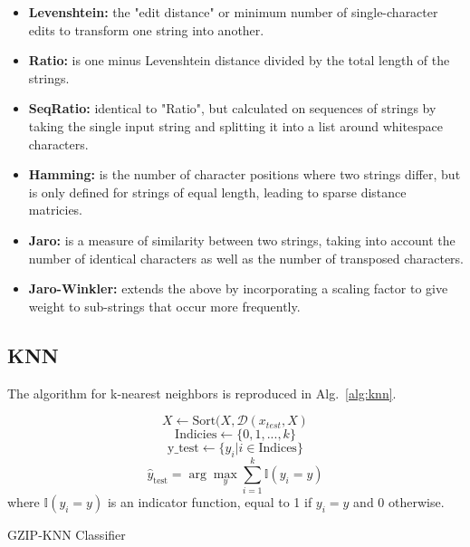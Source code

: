 \documentclass[sigconf]{acmart}
\begin{document}
\begin{itemize}
    \item \textbf{Levenshtein:} the "edit distance" or minimum number of single-character edits to transform one string into another.
    \item \textbf{Ratio:} is one minus Levenshtein distance divided by the total length of the strings.
    \item \textbf{SeqRatio:} identical to "Ratio", but calculated on sequences of strings by taking the single input string and splitting it into a list around whitespace characters.
    \item \textbf{Hamming:} is the number of character positions where two strings differ, but is only defined for strings of equal length, leading to sparse distance matricies.
    \item \textbf{Jaro:} is a measure of similarity between two strings, taking into account the number of identical characters as well as the number of transposed characters.
    \item \textbf{Jaro-Winkler:} extends the above by incorporating a scaling factor to give weight to sub-strings that occur more frequently. 
\end{itemize}


\subsection{KNN}
The algorithm for k-nearest neighbors is reproduced in Alg.~\ref{alg:knn}.

\begin{algorithm}
    
    \[
    X \leftarrow \textrm{Sort}(X, \mathcal{D}(x_{test}, X)
    \]
    \[
    \textrm{Indicies} \leftarrow \{ 0, 1, ..., k \}
    \]
    \[
    \textrm{y_{test}} \leftarrow \{y_i | i \in \textrm{Indices} \}
    \]
    \[
    \hat{y}_{\text{test}} = \arg\max_y \sum_{i=1}^{k} \mathbb{I}(y_i = y)
    \]
    where $\mathbb{I}(y_i = y)$ is an indicator function, equal to 1 if $y_i = y$ and 0 otherwise.
    \caption{GZIP-KNN Classifier}
    \label{alg:knn}
\end{algorithm}
\end{document}
